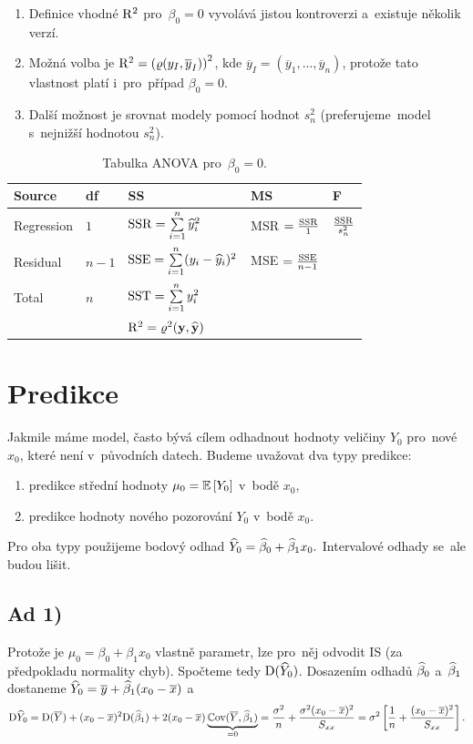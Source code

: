 \begin{enumerate}[1.]
  \item Definice vhodné $\mathrm{R}^2$ pro~$\beta_0 = 0$ vyvolává jistou kontroverzi a~existuje několik verzí.
  \item Možná volba je $\mathrm{R}^2 = \left(\varrho (y_I, \overline{y}_I)\right)^2$, kde $\overline{y}_I = (\overline{y}_1,...,\overline{y}_n)$, protože tato vlastnost platí i~pro~případ $\beta_0 = 0$.
  \item Další možnost je srovnat modely pomocí hodnot $s_n^2$ (preferujeme~model s~nejnižší hodnotou $s_n^2$).
\end{enumerate}\begin{table}[h]
	\begin{tabular}{lllll}
		Source & df & SS & MS & F \\
		\hline
		Regression & $1$ & $\mathrm{SSR} = \sum\limits_{i=1}^{n} \widehat{y}_i^2$ & MSR $ = \frac{\mathrm{SSR}}{1}$ & $\frac{\mathrm{SSR}}{s_n^2}$ \\
		Residual & $n-1$ & $\mathrm{SSE} = \sum\limits_{i=1}^{n} (y_i - \widehat{y}_i)^2$ & MSE $ = \frac{\mathrm{SSE}}{n-1}$ &  \\
		Total & $n$ & $\mathrm{SST} = \sum\limits_{i=1}^{n} y_i^2$ &  &  \\
		\hline
		&  & $\mathrm{R}^2 = \varrho^2(\textbf{y},\widehat{\textbf{y}})$ &  &  \\
	\end{tabular}
\caption{Tabulka ANOVA pro~$\beta_0 = 0$.}
\end{table}

\section{Predikce}
Jakmile máme model, často bývá cílem odhadnout hodnoty veličiny $Y_0$ pro~nové $x_0$, které není v~původních datech. Budeme uvažovat dva typy predikce:\begin{enumerate}[1)]
	\item predikce střední hodnoty $\mu_0 = \mathbb{E}\left[ Y_0 \right]$ v~bodě $x_0$,
	\item predikce hodnoty nového pozorování $Y_0$ v~bodě $x_0$.
\end{enumerate}
Pro oba typy použijeme bodový odhad
 $ \widehat{Y}_0 = \widehat{\beta}_0+\widehat{\beta}_1 x_0. $
Intervalové odhady se~ale budou lišit.

\subsection*{Ad 1)}
	Protože je $\mu_0 = \beta_0+\beta_1 x_0$ vlastně parametr, lze pro~něj odvodit IS (za předpokladu normality chyb).
	Spočteme tedy $\mathrm{D}(\widehat{Y}_0)$. Dosazením odhadů $\widehat{\beta}_0$ a~$\widehat{\beta}_1$ dostaneme $\widehat{Y}_0 = \overline{y}+\widehat{\beta}_1(x_0-\overline{x})$ a
	 $$ \mathrm{D}\widehat{Y}_0 = \mathrm{D}(\overline{Y})+(x_0-\overline{x})^2\mathrm{D}(\widehat{\beta}_1)+2(x_0-\overline{x})\underbrace{\mathbb{C}\mathrm{ov}(\overline{Y},\widehat{\beta}_1)}_{ = 0} = \frac{\sigma^2}{n}+\frac{\sigma^2(x_0-\overline{x})^2}{S_{xx}} = \sigma^2\left[\frac{1}{n}+\frac{(x_0-\overline{x})^2}{S_{xx}} \right]. $$
	
